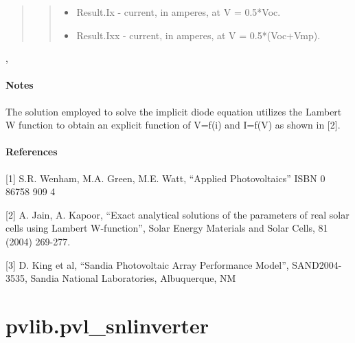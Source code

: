 \documentclass[letterpaper,10pt,english]{sphinxmanual}
\begin{document}
\begin{fulllineitems}
\begin{quote}
\begin{description}
\begin{quote}
\begin{itemize}
\item {} 
Result.Ix -  current, in amperes, at V = 0.5*Voc.

\item {} 
Result.Ixx -  current, in amperes, at V = 0.5*(Voc+Vmp).

\end{itemize}
\end{quote}

\end{description}\end{quote}




{\hyperref[stubs/pvlib.pvl_sapm:pvlib.pvl_sapm]{}}, {\hyperref[stubs/pvlib.pvl_calcparams_desoto:pvlib.pvl_calcparams_desoto]{}}


\paragraph{Notes}

The solution employed to solve the implicit diode equation utilizes
the Lambert W function to obtain an explicit function of V=f(i) and
I=f(V) as shown in {[}2{]}.
\paragraph{References}

{[}1{]} S.R. Wenham, M.A. Green, M.E. Watt, ``Applied Photovoltaics'' 
ISBN 0 86758 909 4

{[}2{]} A. Jain, A. Kapoor, ``Exact analytical solutions of the parameters of 
real solar cells using Lambert W-function'', Solar Energy Materials 
and Solar Cells, 81 (2004) 269-277.

{[}3{]} D. King et al, ``Sandia Photovoltaic Array Performance Model'',
SAND2004-3535, Sandia National Laboratories, Albuquerque, NM

\end{fulllineitems}



\section{pvlib.pvl\_snlinverter}
\label{stubs/pvlib.pvl_snlinverter:pvlib-pvl-snlinverter}\label{stubs/pvlib.pvl_snlinverter::doc}
\end{document}
